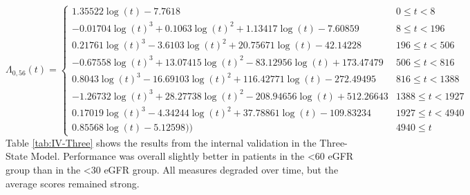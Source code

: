 \documentclass[
]{article}
\begin{document}
\begin{equation}
\Lambda_{0,56}(t)=\begin{cases} 1.35522\log(t)-7.7618 & 0 \le t < 8 \\ -0.01704\log(t)^3+0.1063\log(t)^2+1.13417\log(t)-7.60859 & 8 \le t < 196 \\ 0.21761\log(t)^3-3.6103\log(t)^2+20.75671\log(t)-42.14228 & 196 \le t < 506 \\ -0.67558\log(t)^3+13.07415\log(t)^2-83.12956\log(t)+173.47479 & 506 \le t < 816 \\ 0.8043\log(t)^3-16.69103\log(t)^2+116.42771\log(t)-272.49495 & 816 \le t < 1388 \\ -1.26732\log(t)^3+28.27738\log(t)^2-208.94656\log(t)+512.26643 & 1388 \le t < 1927 \\ 0.17019\log(t)^3-4.34244\log(t)^2+37.78861\log(t)-109.83234 & 1927 \le t < 4940 \\ 0.85568\log(t)-5.12598)) & 4940 \le t \label{eq:CH-Three-56}\end{cases}
\end{equation}
Table \ref{tab:IV-Three} shows the results from the internal validation in the Three-State Model. Performance was overall slightly better in patients in the \textless60 eGFR group than in the \textless30 eGFR group. All measures degraded over time, but the average scores remained strong.
\end{document}
